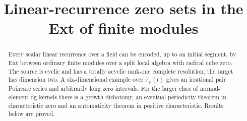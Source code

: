 \documentclass[11pt]{article}
\title{Linear-recurrence zero sets in the Ext of finite modules}
\author{\workingauthor}\date{\coursedate}
\begin{document}
\maketitle
\begin{abstract}
Every scalar linear recurrence over a field can be encoded, up to an
initial segment, by Ext between ordinary finite modules over a split
local algebra with radical cube zero. The source is cyclic and has a
totally acyclic rank-one complete resolution; the target has dimension
two. A six-dimensional example over $\mathbb F_p(t)$ gives an
irrational pair Poincar\'e series and arbitrarily long zero intervals.
For the larger class of normal-element dg kernels there is a growth
dichotomy, an eventual periodicity theorem in characteristic zero and
an automaticity theorem in positive characteristic. Results below
are proved.
\end{abstract}
\end{document}
